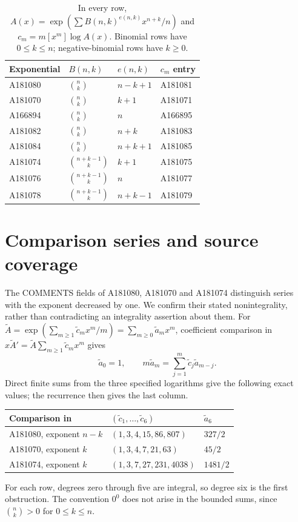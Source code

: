 \documentclass[11pt]{article}
\begin{document}
\begin{table}[ht]
\centering\small
\renewcommand{\arraystretch}{1.65}
\begin{tabular}{@{}llll@{}}\toprule
Exponential & $B(n,k)$ & $e(n,k)$ & $c_m$ entry\\\midrule
A181080 & $\binom nk$ & $n-k+1$ & A181081\\
A181070 & $\binom nk$ & $k+1$ & A181071\\
A166894 & $\binom nk$ & $n$ & A166895\\
A181082 & $\binom nk$ & $n+k$ & A181083\\
A181084 & $\binom nk$ & $n+k+1$ & A181085\\
A181074 & $\binom{n+k-1}{k}$ & $k+1$ & A181075\\
A181076 & $\binom{n+k-1}{k}$ & $n$ & A181077\\
A181078 & $\binom{n+k-1}{k}$ & $n+k-1$ & A181079\\\bottomrule
\end{tabular}
\caption{In every row, $A(x)=\exp(\sum B(n,k)^{e(n,k)}x^{n+k}/n)$
and $c_m=m[x^m]\log A(x)$. Binomial rows have $0\leq k\leq n$;
negative-binomial rows have $k\geq0$.}\label{tab:families}
\end{table}

\section{Comparison series and source coverage}
The COMMENTS fields of A181080, A181070 and A181074 distinguish series with
the exponent decreased by one. We confirm their stated nonintegrality,
rather than contradicting an integrality assertion about them.
For $\widetilde A=\exp(\sum_{m\geq1}\widetilde c_m x^m/m)
=\sum_{m\geq0}\widetilde a_m x^m$, coefficient comparison in
$x\widetilde A'=\widetilde A\sum_{m\geq1}\widetilde c_m x^m$ gives
\[
 \widetilde a_0=1,\qquad
 m\widetilde a_m=\sum_{j=1}^m\widetilde c_j\widetilde a_{m-j}.
\]
Direct finite sums from the three specified logarithms give the following
exact values; the recurrence then gives the last column.
\begin{center}\small
\begin{tabular}{@{}lll@{}}\toprule
Comparison in & $(\widetilde c_1,\ldots,\widetilde c_6)$ & $\widetilde a_6$\\\midrule
A181080, exponent $n-k$ & $(1,3,4,15,86,807)$ & $327/2$\\
A181070, exponent $k$ & $(1,3,4,7,21,63)$ & $45/2$\\
A181074, exponent $k$ & $(1,3,7,27,231,4038)$ & $1481/2$\\\bottomrule
\end{tabular}
\end{center}
For each row, degrees zero through five are integral, so degree six is the
first obstruction. The convention $0^0$ does not arise in the bounded sums,
since $\binom nk>0$ for $0\leq k\leq n$.
\end{document}
